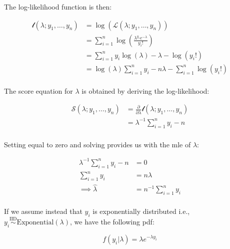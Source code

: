 \documentclass{report}
\begin{document}
The log-likelihood function is then:

\begin{equation}\label{eq:ex-glm-mle-poisson-loglik}
    \begin{aligned}
        \mathcal{l}(\lambda;y_1, \dots, y_n) 
          &= \log\left(\mathcal{L}(\lambda;y_1, \dots, y_n)\right) \\
          &= \sum_{i=1}^n \log\left(\frac{\lambda^{y_i}e^{-\lambda}}{y_i!}\right) \\
          &= \sum_{i=1}^n y_i\log(\lambda) - \lambda - \log(y_i!) \\
          &= \log(\lambda)\sum_{i=1}^n y_i -n\lambda - \sum_{i=1}^n \log(y_i!) \\
    \end{aligned}
\end{equation}

The score equation for $\lambda$ is obtained by deriving the log-likelihood:

\begin{equation}\label{eq:ex-glm-mle-poisson-score-equation}
    \begin{aligned}
        \mathcal{S}(\lambda; y_1, \dots, y_n)
          &= \frac{\partial}{\partial\lambda} \mathcal{l}(\lambda;y_1, \dots, y_n) \\
          &= \lambda^{-1}\sum_{i=1}^n y_i - n \\
    \end{aligned}
\end{equation}

Setting equal to zero and solving provides us with the \gls{mle} of $\lambda$:

\begin{equation}\label{eq:ex-glm-mle-poisson-lambda-mle}
    \begin{aligned}
        \lambda^{-1}\sum_{i=1}^n y_i - n &= 0 \\
        \sum_{i=1}^n y_i &= n\lambda \\
        \implies \hat{\lambda} &= n^{-1}\sum_{i=1}^n y_i \\
    \end{aligned}
\end{equation}

If we assume instead that $y_i$ is exponentially distributed i.e., $y_i \overset{\text{IID}}{\sim}\text{Exponential}(\lambda)$, we have the following \gls{pdf}:

\begin{equation}\label{eq:ex-glm-mle-exponential-dist}
    f(y_i|\lambda) = \lambda e^{-\lambda y_i}
\end{equation}
\end{document}
